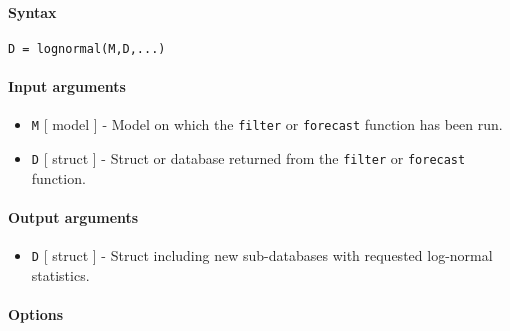 


	\paragraph{Syntax}\label{syntax}

\begin{verbatim}
D = lognormal(M,D,...)
\end{verbatim}

\paragraph{Input arguments}\label{input-arguments}

\begin{itemize}
\item
  \texttt{M} {[} model {]} - Model on which the \texttt{filter} or
  \texttt{forecast} function has been run.
\item
  \texttt{D} {[} struct {]} - Struct or database returned from the
  \texttt{filter} or \texttt{forecast} function.
\end{itemize}

\paragraph{Output arguments}\label{output-arguments}

\begin{itemize}
\itemsep1pt\parskip0pt
\item
  \texttt{D} {[} struct {]} - Struct including new sub-databases with
  requested log-normal statistics.
\end{itemize}

\paragraph{Options}\label{options}

